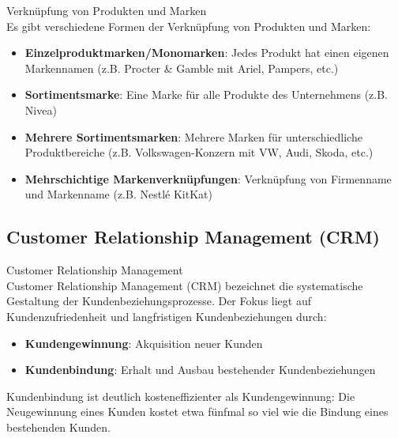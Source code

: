 \begin{definition}{Verknüpfung von Produkten und Marken}\\
Es gibt verschiedene Formen der Verknüpfung von Produkten und Marken:
\begin{itemize}
    \item \textbf{Einzelproduktmarken/Monomarken}: Jedes Produkt hat einen eigenen Markennamen (z.B. Procter \& Gamble mit Ariel, Pampers, etc.)
    \item \textbf{Sortimentsmarke}: Eine Marke für alle Produkte des Unternehmens (z.B. Nivea)
    \item \textbf{Mehrere Sortimentsmarken}: Mehrere Marken für unterschiedliche Produktbereiche (z.B. Volkswagen-Konzern mit VW, Audi, Skoda, etc.)
    \item \textbf{Mehrschichtige Markenverknüpfungen}: Verknüpfung von Firmenname und Markenname (z.B. Nestlé KitKat)
\end{itemize}
\end{definition}

\subsection{Customer Relationship Management (CRM)}

\begin{definition}{Customer Relationship Management}\\
Customer Relationship Management (CRM) bezeichnet die systematische Gestaltung der Kundenbeziehungsprozesse. Der Fokus liegt auf Kundenzufriedenheit und langfristigen Kundenbeziehungen durch:
\begin{itemize}
    \item \textbf{Kundengewinnung}: Akquisition neuer Kunden
    \item \textbf{Kundenbindung}: Erhalt und Ausbau bestehender Kundenbeziehungen
\end{itemize}

Kundenbindung ist deutlich kosteneffizienter als Kundengewinnung: Die Neugewinnung eines Kunden kostet etwa fünfmal so viel wie die Bindung eines bestehenden Kunden.
\end{definition}


